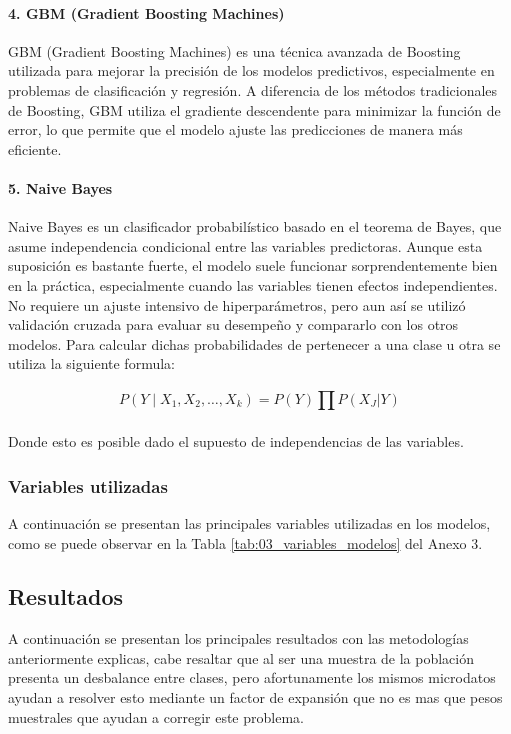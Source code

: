 \documentclass[12pt,a4paper,onecolumn]{article}
\begin{document}
\paragraph{4. GBM (Gradient Boosting Machines)}

GBM (Gradient Boosting Machines) es una técnica avanzada de Boosting utilizada para mejorar la precisión de los modelos predictivos, especialmente en problemas de clasificación y regresión. A diferencia de los métodos tradicionales de Boosting, GBM utiliza el gradiente descendente para minimizar la función de error, lo que permite que el modelo ajuste las predicciones de manera más eficiente.

\paragraph{5. Naive Bayes}

Naive Bayes es un clasificador probabilístico basado en el teorema de Bayes, que asume independencia condicional entre las variables predictoras. Aunque esta suposición es bastante fuerte, el modelo suele funcionar sorprendentemente bien en la práctica, especialmente cuando las variables tienen efectos independientes. No requiere un ajuste intensivo de hiperparámetros, pero aun así se utilizó validación cruzada para evaluar su desempeño y compararlo con los otros modelos. Para calcular dichas probabilidades de pertenecer a una clase u otra se utiliza la siguiente formula:

$$P\left( Y \middle| X_{1},X_{2},\ldots,X_{k} \right) = P(Y)\prod_{}^{}{P(X_{J}|Y)}$$

Donde esto es posible dado el supuesto de independencias de las variables.

\subsubsection{Variables utilizadas}
A continuación se presentan las principales variables utilizadas en los modelos, como se puede observar en la Tabla \ref{tab:03_variables_modelos} del Anexo 3.

\subsection{Resultados}

A continuación se presentan los principales resultados con las metodologías anteriormente explicas, cabe resaltar que al ser una muestra de la población presenta un desbalance entre clases, pero afortunamente los mismos microdatos ayudan a resolver esto mediante un factor de expansión que no es mas que pesos muestrales que ayudan a corregir este problema.
\end{document}
